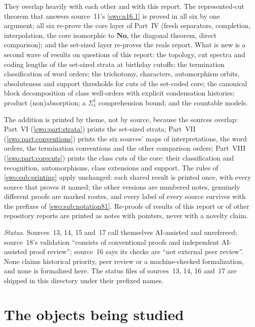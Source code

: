 \documentclass[11pt]{article}
\theoremstyle{definition}
\theoremstyle{remark}
\newcommand{\No}{\mathbf{No}}
\begin{document}
They overlap heavily with each other and with this report. The
represented-cut theorem that answers source~11's \cref{swo:n16.1} is proved
in all six by one argument; all six re-prove the core layer of Part~IV
(fresh separators, completion, interpolation, the core isomorphic to $\No$,
the diagonal theorem, direct comparison); and the set-sized layer re-proves
the reals report. What is new is a second wave of results on questions of
this report: the topology, cut spectra and coding lengths of the set-sized
strata at birthday cutoffs; the termination classification of word orders;
the trichotomy, characters, automorphism orbits, absoluteness and support
thresholds for cuts of the set-coded core; the canonical block decomposition
of class well-orders with explicit condensation histories; product
(non)absorption; a $\Sigma^1_1$ comprehension bound; and the countable models.

The addition is printed by theme, not by source, because the sources overlap:
Part~VI (\cref{swo:part:strata}) prints the set-sized strata; Part~VII
(\cref{swo:part:conventions}) prints the six sources' maps of interpretations,
the word orders, the termination conventions and the other comparison orders;
Part~VIII (\cref{swo:part:corecuts}) prints the class cuts of the core:
their classification and recognition, automorphisms, class extensions and
support.
The rules of
\cref{swo:sub:printing} apply unchanged: each shared result is printed once,
with every source that proves it named; the other versions are numbered
notes, genuinely different proofs are marked routes, and every label of every
source survives with the prefixes of \cref{swo:sub:notation81}. Re-proofs of
results of this report or of other repository reports are printed as notes
with pointers, never with a novelty claim.

\emph{Status.} Sources~13, 14, 15 and~17 call themselves AI-assisted and
unrefereed; source~18's validation ``consists of conventional proofs and
independent AI-assisted proof review''; source~16 says its checks are ``not
external peer review''. None claims historical priority, peer review or a
machine-checked formalization, and none is formalized here. The status files
of sources~13, 14, 16 and~17 are shipped in this directory under their
prefixed names.

\section{The objects being studied}\label{swo:sec:objects}
\end{document}
